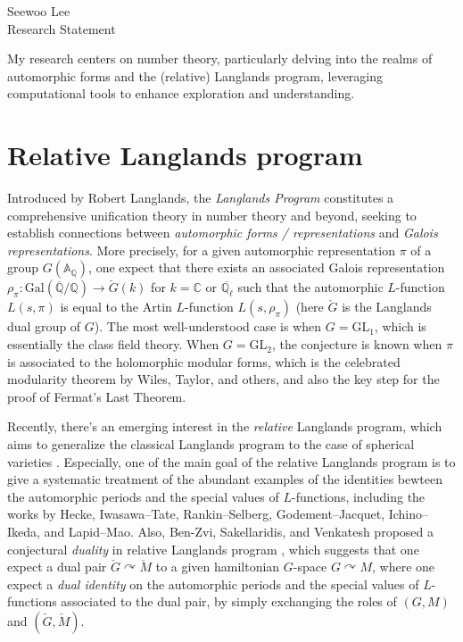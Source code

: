 \documentclass[12pt]{article}
\begin{document}
\noindent Seewoo Lee \\
Research Statement \\
\bigskip



My research centers on number theory, particularly delving into the realms of automorphic forms and the (relative) Langlands program, leveraging computational tools to enhance exploration and understanding.


\section*{Relative Langlands program}

Introduced by Robert Langlands, the \emph{Langlands Program} constitutes a comprehensive unification theory in number theory and beyond, seeking to establish connections between \emph{automorphic forms / representations} and \emph{Galois representations}.
More precisely, for a given automorphic representation $\pi$ of a group $G(\mathbb{A}_{\mathbb{Q}})$, one expect that there exists an associated Galois representation $\rho_{\pi}: \mathrm{Gal}(\overline{\mathbb{Q}} / \mathbb{Q}) \to \check{G}(k)$ for $k = \mathbb{C}$ or $\overline{\mathbb{Q}_{\ell}}$ such that the automorphic $L$-function $L(s, \pi)$ is equal to the Artin $L$-function $L(s, \rho_{\pi})$ (here $\check{G}$ is the Langlands dual group of $G$).
The most well-understood case is when $G = \mathrm{GL}_{1}$, which is essentially the class field theory.
When $G = \mathrm{GL}_{2}$, the conjecture is known when $\pi$ is associated to the holomorphic modular forms, which is the celebrated modularity theorem by Wiles, Taylor, and others, and also the key step for the proof of Fermat's Last Theorem.

Recently, there's an emerging interest in the \emph{relative} Langlands program, which aims to generalize the classical Langlands program to the case of spherical varieties \cite{sakellaridis2012spherical,sakellaridis2017periods}.
Especially, one of the main goal of the relative Langlands program is to give a systematic treatment of the abundant examples of the identities bewteen the automorphic periods and the special values of $L$-functions, including the works by Hecke, Iwasawa--Tate, Rankin--Selberg, Godement--Jacquet, Ichino--Ikeda, and Lapid--Mao.
Also, Ben-Zvi, Sakellaridis, and Venkatesh proposed a conjectural \emph{duality} in relative Langlands program \cite{ben2023relative}, which suggests that one expect a dual pair $\check{G} \curvearrowright \check{M}$ to a given hamiltonian $G$-space $G \curvearrowright M$, where one expect a \emph{dual identity} on the automorphic periods and the special values of $L$-functions associated to the dual pair, by simply exchanging the roles of $(G, M)$ and $(\check{G}, \check{M})$.
\end{document}
